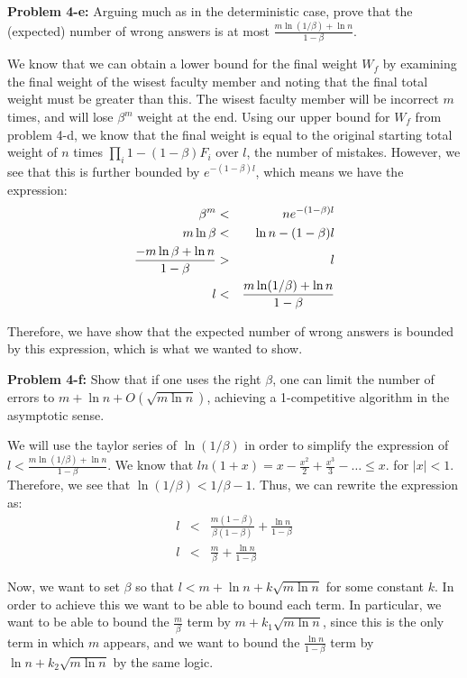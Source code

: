 \documentclass[psamsfonts]{amsart}
\newenvironment{sol}{\vspace{0.25cm}{\large \bfseries Solution:}}{\qedsymbol}
\newenvironment{prob}[1]{\begin{framed}{\large \bfseries Problem #1:}}{\end{framed}}
\begin{document}
\begin{prob}{4-e}
Arguing much as in the deterministic case, prove that the (expected) number of wrong answers is at most $\frac{m \ln (1/\beta) + \ln n}{1 - \beta}$. 
\end{prob}
\begin{sol}
We know that we can obtain a lower bound for the final weight $W_f$ by examining the final weight of the wisest faculty member and noting that the final total weight must be greater than this. The wisest faculty member will be incorrect $m$ times, and will lose $\beta^m$ weight at the end. Using our upper bound for $W_f$ from problem 4-d, we know that the final weight is equal to the original starting total weight of $n$ times $\prod_i 1 - (1 - \beta)F_i$ over $l$, the number of mistakes. However, we see that this is further bounded by $e^{-(1 - \beta) l}$, which means we have the expression:
\begin{eqnarray}
\beta^m &<& n e^{-(1 - \beta) l} \\
m \ln \beta &<& \ln n - (1 - \beta) l \\
{{-m \ln \beta + \ln n} \over {1 - \beta}} &>& l \\
l &<& {{m \ln (1/\beta) + \ln n} \over {1 - \beta}}
\end{eqnarray}

Therefore, we have show that the expected number of wrong answers is bounded by this expression, which is what we wanted to show.
\end{sol}

\begin{prob}{4-f}
Show that if one uses the right $\beta$, one can limit the number of errors to $m + \ln n + O( \sqrt{m \ln n})$, achieving a 1-competitive algorithm in the asymptotic sense.
\end{prob}
\begin{sol}
We will use the taylor series of $\ln(1/\beta)$ in order to simplify the expression of $l < \frac{m \ln(1/\beta) + \ln n}{ 1 - \beta}$. We know that $ln(1 + x) = x - \frac{x^2}{2} + \frac{x^3}{3} - \ldots \leq x$. for $|x| < 1$. Therefore, we see that $\ln(1/\beta) < 1/\beta - 1$. Thus, we can rewrite the expression as:
\begin{eqnarray}
l &<& \frac{m (1 - \beta)}{\beta(1 - \beta)} + \frac{\ln n}{1 - \beta} \\
l &<& \frac{m}{\beta} + \frac{\ln n}{1 - \beta}
\end{eqnarray}

Now, we want to set $\beta$ so that $l < m + \ln n + k \sqrt{m \ln n}$ for some constant $k$. In order to achieve this we want to be able to bound each term. In particular, we want to be able to bound the $\frac{m}{\beta}$ term by $m + k_1 \sqrt{m \ln n}$, since this is the only term in which $m$ appears, and we want to bound the $\frac{\ln n}{1 - \beta}$ term by $\ln n + k_2 \sqrt{m \ln n}$ by the same logic.

\end{sol}
\end{document}
